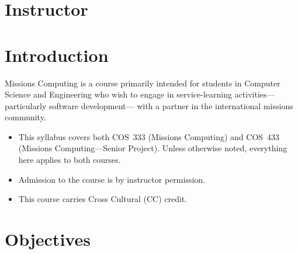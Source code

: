 \documentclass[11pt]{article}
\begin{document}
\section{Instructor}


\section{Introduction}

Missions Computing is a course primarily intended
for students in Computer Science and Engineering
who wish to engage in service-learning activities---%
particularly software development---%
with a partner in the international missions community.
\begin{itemize}
\item
  This syllabus covers
  both COS~333 (Missions Computing)
  and COS~433 (Missions Computing---Senior Project).
  Unless otherwise noted,
  everything here applies to both courses.
\item
  Admission to the course is by instructor permission.
\item
  This course carries Cross Cultural (CC) credit.
\end{itemize}

\section{Objectives}
\end{document}
